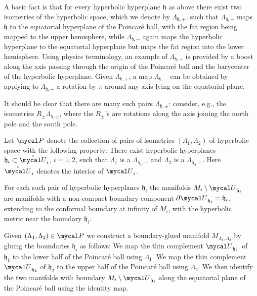 \documentclass[a4paper,10pt]{article}
\newcommand{\horo}{\red{\mathfrak{h}}}
\newcommand{\horoG}{\red{\mycal P}}
\newcommand{\blue}[1]{{\color{blue}#1}}
\newcommand{\red}[1]{{\color{red}#1}}
\newcommand{\mcU}{{\mycal U}}
\renewcommand{\red}[1]{#1}%
\renewcommand{\blue}[1]{#1}%
\begin{document}
      A basic fact is that for every  hyperbolic hyperplane $\horo$ as above
      there exist two isometries of the hyperbolic space, which we denote by $\Lambda_{\horo,\pm}$, such
      that $\Lambda_{\horo,+}$ maps $\horo$  to the
      equatorial hyperplane  of the
      Poincar\'e ball, with the fat region being mapped to the upper hemisphere, while $\Lambda_{\horo,-}$ again maps the  hyperbolic hyperplane to the
      equatorial hyperplane but maps the fat region into the lower
      hemisphere. Using physics terminology, an example  of $\Lambda_{\horo,+}$ is
      provided by a boost along the axis passing through the origin of
      the Poincar\'e ball and the barycenter of the hyperbolic hyperplane.  Given
      $\Lambda_{\horo,+}$, a map $\Lambda_{\horo,-}$ can be obtained by applying to
      $\Lambda_{\horo,+}$ a rotation by $\pi$ around any axis lying on the
      equatorial plane.

      It should be clear that there are many such pairs $ \Lambda_{\horo,\pm}$:
      consider, e.g., the isometries $R_\pm \Lambda_{\horo,\pm}$, where the
      $R_\pm$'s are rotations along the axis joining the north pole and the south pole.

      Let $\horoG$ denote the collection of pairs of isometries
      $(\Lambda_1,\Lambda_2)$ of hyperbolic space with the following property:
      There exist  hyperbolic hyperplanes $\horo_i\subset \mathring\mcU_i$, $i=1,2$,
      such that $\Lambda_1$ is a $\Lambda_{\blue{\horo_{1}},+}$
      and $\Lambda_2$ is a
      $\Lambda_{\horo_2,-}$. Here $ \mathring\mcU_i$ denotes the interior of
      $\mcU_i$.


      For each such pair of  hyperbolic hyperplanes $\horo_i$ the manifolds
      $M_i\setminus \mcU_{\horo_i}$ are manifolds with a non-compact boundary component
      $ \partial \mcU_{\horo_i} = \horo_i$, extending to the conformal boundary at infinity
      of $M_i$, with the hyperbolic metric near the boundary $\horo_i$.

      Given $(\Lambda_1,\Lambda_2)\in \horoG$ we construct a boundary-glued
      manifold $M_{\Lambda_1,\Lambda_2}$ by gluing the boundaries $\horo_i$ as
      follows: We map the thin complement $\mcU_{\blue{\horo_{1}}}$ of $\blue{\horo_{1}}$
      to the
      lower half of the Poincar\'e ball using $\Lambda_1$. We map the thin
      complement $\mcU_{\horo_2}$ of $\horo_2$ to the upper half of the Poincar\'e
      ball using $\Lambda_2$. We then identify the two manifolds with boundary
      $M_i\setminus \mcU_{\horo_i}$
      along the equatorial plane of the Poincar\'e
      ball using the identity map.
\end{document}

